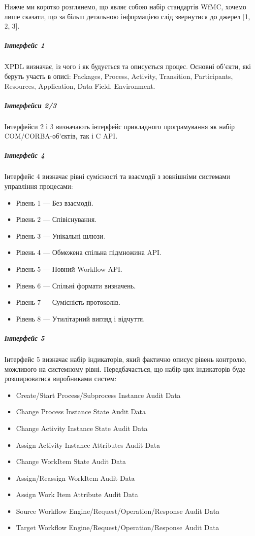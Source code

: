 \documentclass{memoir}
\begin{document}
Нижче ми коротко розглянемо, що являє собою набір стандартів WfMC, хочемо лише сказати, що за більш детальною інформацією слід звернутися до джерел [1, 2, 3].

\subparagraph{Інтерфейс 1}

XPDL визначає, із чого і як будується та описується процес. Основні об’єкти, які беруть участь в описі: Packages, Process, Activity, Transition, Participants, Resources, Application, Data Field, Environment.

\subparagraph{Інтерфейси 2/3}

Інтерфейси 2 і 3 визначають інтерфейс прикладного програмування як набір COM/CORBA-об’єктів, так і C API.

\subparagraph{Інтерфейс 4}

Інтерфейс 4 визначає рівні сумісності та взаємодії з зовнішніми системами управління процесами:

\begin{itemize}
    \item Рівень 1 — Без взаємодії.
    \item Рівень 2 — Співіснування.
    \item Рівень 3 — Унікальні шлюзи.
    \item Рівень 4 — Обмежена спільна підмножина API.
    \item Рівень 5 — Повний Workflow API.
    \item Рівень 6 — Спільні формати визначень.
    \item Рівень 7 — Сумісність протоколів.
    \item Рівень 8 — Утилітарний вигляд і відчуття.
\end{itemize}

\subparagraph{Інтерфейс 5}

Інтерфейс 5 визначає набір індикаторів, який фактично описує рівень контролю, можливого на системному рівні. Передбачається, що набір цих індикаторів буде розширюватися виробниками систем:

\begin{itemize}
    \item Create/Start Process/Subprocess Instance Audit Data
    \item Change Process Instance State Audit Data
    \item Change Activity Instance State Audit Data
    \item Assign Activity Instance Attributes Audit Data
    \item Change WorkItem State Audit Data
    \item Assign/Reassign WorkItem Audit Data
    \item Assign Work Item Attribute Audit Data
    \item Source Workflow Engine/Request/Operation/Response Audit Data
    \item Target Workflow Engine/Request/Operation/Response Audit Data
\end{itemize}
\end{document}
